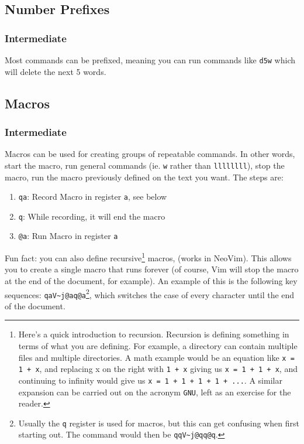\documentclass[11pt]{article}
\begin{document}
\subsection{Number Prefixes}
\label{sec:orgd43ada3}
\subsubsection{Intermediate}
\label{sec:org7e3b9de}
Most commands can be prefixed, meaning you can run commands like \texttt{d5w} which
will delete the next 5 words.
\subsection{Macros}
\label{sec:org3d829aa}
\subsubsection{Intermediate}
\label{sec:orgb88b5fb}
Macros can be used for creating groups of repeatable commands. In other words,
start the macro, run general commands (ie. \texttt{w} rather than \texttt{llllllll}), stop the
macro, run the macro previously defined on the text you want. The steps are:

\begin{enumerate}
\item \texttt{qa}: Record Macro in register \texttt{a}, see below
\item \texttt{q}: While recording, it will end the macro
\item \texttt{@a}: Run Macro in register \texttt{a}
\end{enumerate}

Fun fact: you can also define recursive\footnote{Here's a quick introduction to recursion. Recursion is defining 
something in terms of what you are defining. For example, a directory 
can contain multiple files and multiple directories. A math example 
would be an equation like \texttt{x = 1 + x}, and replacing x on the right with
\texttt{1 + x} giving us \texttt{x = 1 + 1 + x}, and continuing to infinity would give
us \texttt{x = 1 + 1 + 1 + 1 + ...}. A similar expansion can be carried out 
on the acronym \texttt{GNU}, left as an exercise for the reader.} macros, (works in NeoVim). This
allows you to create a single macro that runs forever (of course, Vim will stop
the macro at the end of the document, for example). An example of this is the
following key sequences: \texttt{qaV\textasciitilde{}j@aq@a}\footnote{Usually the \texttt{q} register is used for macros, but this can get
confusing when first starting out. The command would then be \texttt{qqV\textasciitilde{}j@qq@q}.}, which switches the case of every
character until the end of the document.
\end{document}
